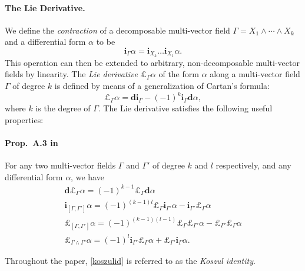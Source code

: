 \documentclass[a4paper,12pt]{scrartcl}
\begin{document}
\paragraph{The Lie Derivative.}

  We define the \emph{ contraction} of a decomposable multi-vector field $\Gamma = X_1 \wedge \cdots \wedge X_k$ and a differential form $\alpha$ to be
\[
	\mathbf{i}_\Gamma \alpha = \mathbf{i}_{X_k} \ldots \mathbf{i}_{X_1} \alpha.
\]
This operation can then be extended to arbitrary, non-decomposable multi-vector fields by linearity.  The \emph{ Lie derivative} $\pounds_\Gamma \alpha$ of the form $\alpha$ along a multi-vector field $\Gamma$ of degree $k$ is defined by means of a generalization of Cartan's formula:
\[
	\pounds_\Gamma \alpha = \mathbf{d} \mathbf{i}_\Gamma
		- (-1)^k \mathbf{i}_\Gamma \mathbf{d} \alpha, 
\]
where $k$ is the degree of $\Gamma$.  The Lie derivative satisfies the following useful properties:

\paragraph{Prop.~A.3 in \cite{FoPaRo2005}}
	For any two multi-vector fields $\Gamma$ and $\Gamma'$ of degree $k$ and $l$ respectively, and any differential form $\alpha$, we have 
	\begin{gather}
		\mathbf{d} \pounds_\Gamma \alpha = (-1)^{k - 1} \pounds_\Gamma \mathbf{d} \alpha \\[2ex]
		\label{koszulid}
		\mathbf{i}_{[\Gamma, \Gamma']} \alpha = (-1)^{(k - 1)l} 
			\pounds_\Gamma \mathbf{i}_{\Gamma'} \alpha -
			\mathbf{i}_{\Gamma'} \pounds_{\Gamma} \alpha \\[2ex]
		\pounds_{[\Gamma, \Gamma']} \alpha = 
			(-1)^{(k - 1)(l - 1)} \pounds_\Gamma \pounds_{\Gamma'} \alpha
			- \pounds_{\Gamma'} \pounds_{\Gamma} \alpha \\[2ex]
		\pounds_{\Gamma \wedge \Gamma'} \alpha = 
			(-1)^l \mathbf{i}_{\Gamma'} \pounds_\Gamma \alpha 
			+ \pounds_{\Gamma'} \mathbf{i}_\Gamma \alpha.
	\end{gather}


Throughout the paper, \eqref{koszulid} is referred to as the \emph{ Koszul identity}.
\end{document}
